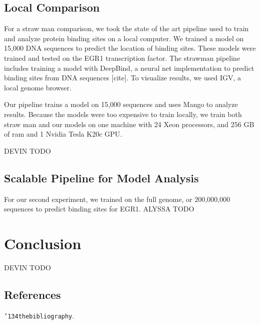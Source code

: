 \documentclass{sig-alternate-05-2015}
\begin{document}
\subsection{Local Comparison}
For a straw man comparison, we took the state of the art pipeline used to train and analyze protein binding sites on a local computer. We trained a model on 15,000 DNA sequences to predict the location of binding sites. These models were trained and tested on the EGR1 transcription factor. The strawman pipeline includes training a model with DeepBind, a neural net implementation to predict binding sites from DNA sequences [cite]. To visualize results, we used IGV, a local genome browser.


Our pipeline trains a model on 15,000 sequences and uses Mango to analyze results. Because the models were too expensive to train locally, we train both straw man and our models on one machine with 24 Xeon processors, and 256 GB of ram and 1 Nvidia Tesla K20c GPU.

DEVIN TODO

\subsection{Scalable Pipeline for Model Analysis}
For our second experiment, we trained on the full genome, or 200,000,000 sequences to predict binding sites for EGR1.
ALYSSA TODO

\section{Conclusion}
DEVIN TODO



\subsection{References}
\texttt{{\char'134}thebibliography}.
\end{document}
